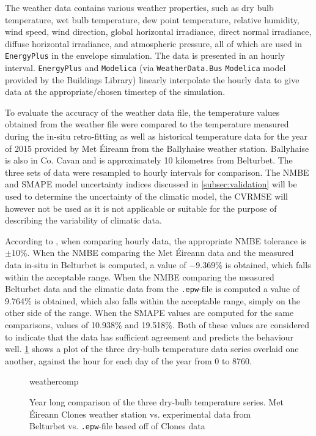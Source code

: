 The weather data contains various weather properties, such as dry bulb temperature, wet bulb temperature, dew point temperature, relative humidity, wind speed, wind direction, global horizontal irradiance, direct normal irradiance, diffuse horizontal irradiance, and atmospheric pressure, all of which are used in \texttt{EnergyPlus} in the envelope simulation. The data is presented in an hourly interval. \texttt{EnergyPlus} and \texttt{Modelica} (via \texttt{WeatherData.Bus} \texttt{Modelica} model provided by the Buildings Library) linearly interpolate the hourly data to give data at the appropriate/chosen timestep of the simulation. 

To evaluate the accuracy of the weather data file, the temperature values obtained from the weather file were compared to the temperature measured during the in-situ retro-fitting as well as historical temperature data for the year of 2015 provided by Met Éireann from the Ballyhaise weather station. Ballyhaise is also in Co. Cavan and is approximately 10 kilometres from Belturbet. The three sets of data were resampled to hourly intervals for comparison. The \ac{NMBE} and \ac{SMAPE} model uncertainty indices discussed in \cref{subsec:validation} will be used to determine the uncertainty of the climatic model, the \ac{CVRMSE} will however not be used as it is not applicable or suitable for the purpose of describing the variability of climatic data. 

According to  \cite{ashrae_guideline_project_committee_14_ashrae_2014}, when comparing hourly data, the appropriate \ac{NMBE} tolerance is $\pm10\%$. When the \ac{NMBE} comparing the Met Éireann data and the measured data  in-situ in Belturbet is computed, a value of \num{-9.369}\% is obtained, which falls within the acceptable range. When the \ac{NMBE} comparing the measured Belturbet data and the climatic data from the \texttt{.epw}-file is computed a value of \num{9.764}\% is obtained, which also falls within the acceptable range, simply on the other side of the range. When the \ac{SMAPE} values are computed for the same comparisons, values of \num{10.938}\% and \num{19.518}\%. Both of these values are considered to indicate that the data has sufficient agreement and predicts the behaviour well. \cref{fig:weathercomp} shows a plot of the three dry-bulb temperature data series overlaid one another, against the hour for each day of the year from 0 to 8760. 

\begin{figure}[htb]
    \centering
    {weathercomp}
    \caption{Year long comparison of the three dry-bulb temperature series. Met Éireann Clones weather station vs. experimental data from Belturbet vs. \texttt{.epw}-file based off of Clones data}
    \label{fig:weathercomp}
\end{figure}

